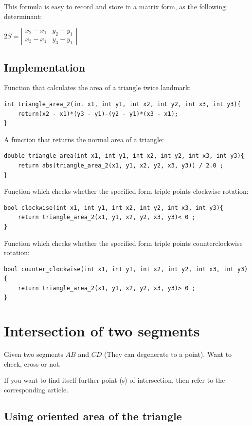 This formula is easy to record and store in a matrix form, as the following determinant:

$2S=\left|\begin{array}{cc}
x_{2}-x_{1} & y_{2}-y_{1}\\
x_{3}-x_{1} & y_{3}-y_{1}
\end{array}\right|$

\subsection{ Implementation }

Function that calculates the area of ​​a triangle twice landmark:

\begin{verbatim}
int triangle_area_2(int x1, int y1, int x2, int y2, int x3, int y3){
    return(x2 - x1)*(y3 - y1)-(y2 - y1)*(x3 - x1);
} 
\end{verbatim}
A function that returns the normal area of ​​a triangle:

\begin{verbatim}
double triangle_area(int x1, int y1, int x2, int y2, int x3, int y3){
    return abs(triangle_area_2(x1, y1, x2, y2, x3, y3)) / 2.0 ;
} 
\end{verbatim}
Function which checks whether the specified form triple points clockwise rotation:

\begin{verbatim}
bool clockwise(int x1, int y1, int x2, int y2, int x3, int y3){
    return triangle_area_2(x1, y1, x2, y2, x3, y3)< 0 ;
} 
\end{verbatim}
Function which checks whether the specified form triple points counterclockwise rotation:

\begin{verbatim}
bool counter_clockwise(int x1, int y1, int x2, int y2, int x3, int y3){
    return triangle_area_2(x1, y1, x2, y2, x3, y3)> 0 ;
} 
\end{verbatim}
\section{ Intersection of two segments }
Given two segments $AB$ and $CD$ (They can degenerate to a point). Want to check, cross or not.

If you want to find itself further point (s) of intersection, then refer to the corresponding article.

\subsection{ Using oriented area of ​​the triangle }

